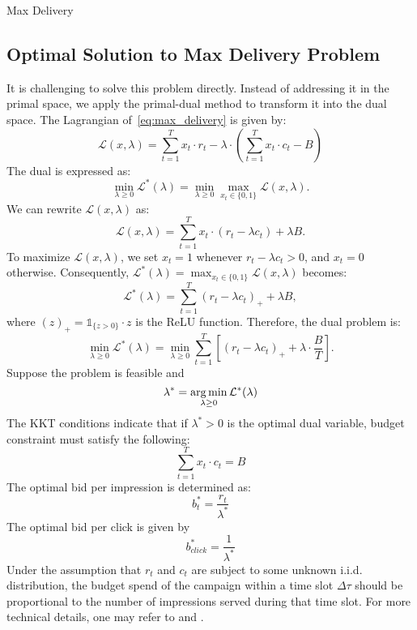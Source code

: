 \documentclass[../main.tex]{subfiles}
\begin{document}
\begin{section}{Max Delivery}
	
	

	
	\subsection* {Optimal Solution to Max Delivery Problem}
		
		It is challenging to solve this problem directly. Instead of addressing it in the primal space, we apply the primal-dual method to transform it into the dual space. The Lagrangian of~\eqref{eq:max_delivery} is given by:
		\begin{equation*} \label{eq:max_delivery_dual}
			\mathcal{L}(x, \lambda) = \sum_{t=1}^T x_t \cdot r_t  - \lambda \cdot \left( \sum_{t=1}^{T} x_t \cdot c_t  - B  \right)
		\end{equation*}
		The dual  is expressed as:
		\begin{equation*}
			\min_{\lambda \geq 0} \mathcal{L}^*(\lambda) = \min_{\lambda \geq 0} \max_{x_t \in \{0,1\}} \mathcal{L}(x, \lambda).
		\end{equation*}
		We can rewrite \(\mathcal{L}(x, \lambda)\) as:
		\begin{equation*}
			\mathcal{L}(x, \lambda) = \sum_{t=1}^T  x_t \cdot (r_t - \lambda c_t)  + \lambda B.
		\end{equation*}
		To maximize \(\mathcal{L}(x, \lambda)\), we set \(x_t = 1\) whenever \(r_t - \lambda c_t > 0\), and \(x_t = 0\) otherwise. Consequently, \(\mathcal{L}^*(\lambda) = \max_{x_t \in \{0,1\}} \mathcal{L}(x, \lambda)\) becomes:
		\begin{equation*}
			\mathcal{L}^*(\lambda) = \sum_{t=1}^{T} (r_t - \lambda c_t)_{+}  + \lambda B,
		\end{equation*}
		where \((z)_{+} = \mathds{1}_{ \{z>0\}} \cdot z\) is the ReLU function. Therefore, the dual problem is:
		\begin{equation}
			\min_{\lambda \geq 0}  \mathcal{L}^*(\lambda) = \min_{\lambda \geq 0}  \sum_{t=1}^{T} \left[ (r_t - \lambda c_t)_{+} + \lambda \cdot \frac{B}{T} \right].
		\end{equation}
	Suppose the problem is feasible and 
	\[
	\lambda^* = \operatorname*{arg\,min}_{\lambda \geq 0} \mathcal{L}^*(\lambda)
	\]
	The KKT conditions indicate that if $\lambda^* > 0$ is the optimal dual variable, budget constraint must satisfy the following:
	\[
	\sum_{t=1}^{T} x_t \cdot c_t = B
	\]
	The optimal bid per impression is determined as: 
	\begin{equation*}
		b_t^* = \frac{r_t}{ \lambda^*}
	\end{equation*}
	The optimal bid per click is given by 
	\begin{equation}
		b^*_{click} = \frac{1}{\lambda^*}
	\end{equation}
	Under the assumption that \(r_t\) and \(c_t\) are subject to some unknown i.i.d. distribution, the budget spend of the campaign within a time slot \(\Delta \tau\) should be proportional to the number of impressions served during that time slot. For more technical details, one may refer to \cite{lee2013real} and \cite{wang2017display}.


\end{section}
\end{document}
